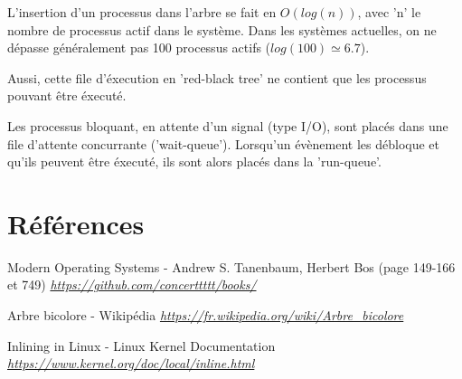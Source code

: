 \documentclass[10pt]{article}
\begin{document}
  L'insertion d'un processus dans l'arbre se fait en $O(log(n))$, avec 'n' le nombre de processus actif dans le système.
  Dans les systèmes actuelles, on ne dépasse généralement pas 100 processus actifs ($log(100) \simeq 6.7$).
  
  Aussi, cette file d'éxecution en 'red-black tree' ne contient que les processus pouvant être éxecuté.
  
  Les processus bloquant, en attente d'un signal (type I/O), sont placés dans une file d'attente concurrante ('wait-queue').
  Lorsqu'un évènement les débloque et qu'ils peuvent être éxecuté, ils sont alors placés dans la 'run-queue'.

    \newpage
    \section{Références}
    \begin{thebibliography}{}

        \label{modernos}
        Modern Operating Systems - Andrew S. Tanenbaum, Herbert Bos (page 149-166 et 749)\newline
        \href{https://github.com/concerttttt/books/blob/master/Modern Operating Systems 4th Edition--Andrew Tanenbaum.pdf}
        {\textit{https://github.com/concerttttt/books/}}\newline
	
	\label{rbtree}
        Arbre bicolore - Wikipédia\newline
        \href{https://fr.wikipedia.org/wiki/Arbre\_bicolore}
        {\textit{https://fr.wikipedia.org/wiki/Arbre\_bicolore}}\newline
	
        \label{inlinefunc}
        Inlining in Linux - Linux Kernel Documentation\newline
        \href{https://www.kernel.org/doc/local/inline.html}
        {\textit{https://www.kernel.org/doc/local/inline.html}}\newline
        
    \end{thebibliography}
    
\end{document}
